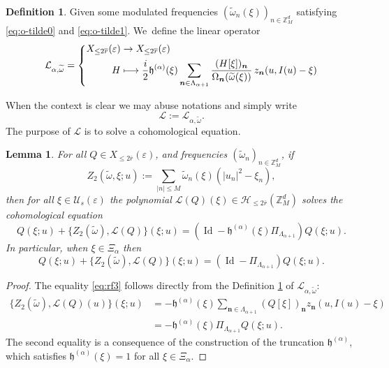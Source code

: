 \documentclass[10pt,a4paper]{amsart}
\newcommand\mto{\mathchoice{\longmapsto}{\mapsto}{\mapsto}{\mapsto}}
\theoremstyle{plain}
\newtheorem{lemma}[theorem]{Lemma}
\theoremstyle{definition}
\newtheorem{definition}[theorem]{Definition}
\DeclareMathOperator{\Id}{Id}
\newcommand{\nb}{{\boldsymbol n}}
\newcommand{\Z}{\mathbb{Z}}
\newcommand{\1}{\mathbf{1}}
\let\epsilon\varepsilon
\begin{document}
\begin{definition}
\label{def:Lie}
Given some modulated frequencies $(\widetilde{\omega}_{n}(\xi))_{n\in\Z_{M}^{d}}$ satisfying \eqref{eq:o-tilde0} and \eqref{eq:o-tilde1}. We~define the linear operator
\begin{equation}
\label{eq:op}
\mathcal{L}_{\alpha,\widetilde{\omega}} = \left\{
\begin{aligned}
X_{\leq2\overline{r}}(\epsilon) & \to X_{\leq2\overline{r}}(\epsilon) \\
H & \mto \frac{i}{2}\mathfrak{h}^{(\alpha)}(\xi)
\sum_{\nb\in\Lambda_{\alpha+1}}
\frac{(H[\xi])_{\nb}}{\Omega_{\nb}(\widetilde{\omega}(\xi))}\,
z_{\nb}(u,I(u)-\xi)
\end{aligned}
\right.
\end{equation}
\end{definition}
When the context is clear we may abuse notations and simply write
\[
\mathcal{L} := \mathcal{L}_{\alpha,\widetilde{\omega}}.
\]
The purpose of $\mathcal{L}$ is to solve a cohomological equation.
\begin{lemma}
\label{lem:24}
For all $Q\in X_{\leq2\overline{r}}(\epsilon)$, and frequencies $(\widetilde{\omega}_{n})_{n\in\Z_{M}^{d}}$, if
\[
Z_{2}(\widetilde{\omega},\xi;u)
:= \sum_{|n|\leq M} \widetilde{\omega}_{n}(\xi)(|u_n|^{2}-\xi_{n}),
\]
then for all $\xi\in\mathcal{U}_{s}(\epsilon)$ the polynomial $\mathcal{L}(Q)(\xi)\in \mathcal{H}_{\leq2\overline{r}}(\Z_{M}^{d})$ solves the cohomological equation
\begin{equation}
\label{eq:rf3}
Q(\xi;u) + \{Z_{2}(\widetilde{\omega}),\mathcal{L}(Q)\}(\xi;u) = (\Id-\mathfrak{h}^{(\alpha)}(\xi)\Pi_{\Lambda_{\alpha+1}})Q(\xi;u).
\end{equation}
In particular, when $\xi\in\Xi_{\alpha}$ then
\[
Q(\xi;u) + \{Z_{2}(\widetilde{\omega}),\mathcal{L}(Q)\}(\xi;u) = (\Id-\Pi_{\Lambda_{\alpha+1}})Q(\xi;u).
\]
\end{lemma}
\begin{proof}
The equality \eqref{eq:rf3} follows directly from the Definition \ref{def:Lie} of $\mathcal{L}_{\alpha,\widetilde{\omega}}$:
\begin{equation}
\begin{split}
\label{eq:rf2}
\{Z_{2}(\widetilde{\omega}),\mathcal{L}(Q)(u)\}(\xi;u)& = - \mathfrak{h}^{(\alpha)}(\xi)\sum_{\nb\in\Lambda_{\alpha+1}}(Q[\xi])_{\nb}z_{\nb}(u,I(u)-\xi)\\& = - \mathfrak{h}^{(\alpha)}(\xi)\Pi_{\Lambda_{\alpha+1}}Q(\xi;u).
\end{split}
\end{equation}
The second equality is a consequence of the construction of the truncation $\mathfrak{h}^{(\alpha)}$, which satisfies $\mathfrak{h}^{(\alpha)}(\xi)=1$ for all $\xi\in\Xi_{\alpha}$.
\end{proof}
\end{document}
